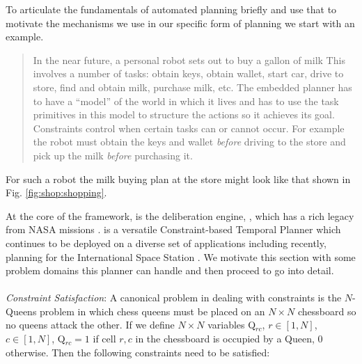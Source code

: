To articulate the fundamentals of automated planning briefly and use
that to motivate the mechanisms we use in our specific form of
planning we start with an example.

{\small
  \begin{quote}
    In the near future, a personal robot sets out to buy a gallon of
    milk This involves a number of tasks: obtain keys, obtain wallet,
    start car, drive to store, find and obtain milk, purchase milk,
    etc.  The embedded planner has to have a ``model'' of the world in
    which it lives and has to use the task primitives in this model to
    structure the actions so it achieves its goal. Constraints control
    when certain tasks can or cannot occur. For example the robot must
    obtain the keys and wallet \emph{before} driving to the store and
    pick up the milk \emph{before} purchasing it.
\end{quote}

For such a robot the milk buying plan at the store might look like
that shown in Fig. \ref{fig:shop:shopping}.

At the core of the \rx framework, is the deliberation engine, \eue,
which has a rich legacy from NASA missions \cite{mus98,rajan00,
  jonsson00,aichang04, bresina05}. \eu is a versatile Constraint-based
Temporal Planner which continues to be deployed on a diverse set of
applications including recently, planning for the International Space
Station \cite{barreiro09}. We motivate this section with some problem
domains this planner can handle and then proceed to go into detail.

\paragraph{} {\em Constraint Satisfaction}: A canonical problem in
dealing with constraints is the $N$-Queens problem in which chess queens
must be placed on an  $N \times N$ chessboard so no queens attack the other. %
If we define $N \times N$ variables Q$_{rc}$, $r \in [1,N]$, $c \in
[1,N]$, Q$_{rc} = 1$ if cell $r,c$ in the chessboard is occupied by a
Queen, $0$ otherwise. Then the following constraints need to be
satisfied:

}
